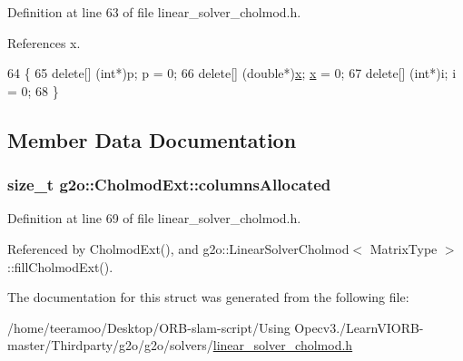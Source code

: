 Definition at line 63 of file linear\+\_\+solver\+\_\+cholmod.\+h.



References x.


\begin{DoxyCode}
64   \{
65     \textcolor{keyword}{delete}[] (\textcolor{keywordtype}{int}*)p; p = 0;
66     \textcolor{keyword}{delete}[] (\textcolor{keywordtype}{double}*)\hyperlink{sparse__block__matrix_8hpp_af88b946fb90d5f08b5fb740c70e98c10}{x}; \hyperlink{sparse__block__matrix_8hpp_af88b946fb90d5f08b5fb740c70e98c10}{x} = 0;
67     \textcolor{keyword}{delete}[] (\textcolor{keywordtype}{int}*)i; i = 0;
68   \}
\end{DoxyCode}


\subsection{Member Data Documentation}
\subsubsection[{\texorpdfstring{columns\+Allocated}{columnsAllocated}}]{\setlength{\rightskip}{0pt plus 5cm}size\+\_\+t g2o\+::\+Cholmod\+Ext\+::columns\+Allocated}\hypertarget{structg2o_1_1CholmodExt_a17fb33389283164f05225ed9670cb8c1}{}\label{structg2o_1_1CholmodExt_a17fb33389283164f05225ed9670cb8c1}


Definition at line 69 of file linear\+\_\+solver\+\_\+cholmod.\+h.



Referenced by Cholmod\+Ext(), and g2o\+::\+Linear\+Solver\+Cholmod$<$ Matrix\+Type $>$\+::fill\+Cholmod\+Ext().



The documentation for this struct was generated from the following file\+:\begin{DoxyCompactItemize}
\item 
/home/teeramoo/\+Desktop/\+O\+R\+B-\/slam-\/script/\+Using Opecv3./\+Learn\+V\+I\+O\+R\+B-\/master/\+Thirdparty/g2o/g2o/solvers/\hyperlink{linear__solver__cholmod_8h}{linear\+\_\+solver\+\_\+cholmod.\+h}\end{DoxyCompactItemize}
